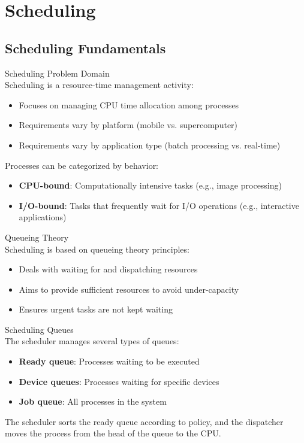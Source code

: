 \section{Scheduling}

\subsection{Scheduling Fundamentals}

\begin{definition}{Scheduling Problem Domain}\\
    Scheduling is a resource-time management activity:
    \begin{itemize}
        \item Focuses on managing CPU time allocation among processes
        \item Requirements vary by platform (mobile vs. supercomputer)
        \item Requirements vary by application type (batch processing vs. real-time)
    \end{itemize}
    
    Processes can be categorized by behavior:
    \begin{itemize}
        \item \textbf{CPU-bound}: Computationally intensive tasks (e.g., image processing)
        \item \textbf{I/O-bound}: Tasks that frequently wait for I/O operations (e.g., interactive applications)
    \end{itemize}
\end{definition}

\begin{definition}{Queueing Theory}\\
    Scheduling is based on queueing theory principles:
    \begin{itemize}
        \item Deals with waiting for and dispatching resources
        \item Aims to provide sufficient resources to avoid under-capacity
        \item Ensures urgent tasks are not kept waiting
    \end{itemize}
\end{definition}

\begin{definition}{Scheduling Queues}\\
    The scheduler manages several types of queues:
    \begin{itemize}
        \item \textbf{Ready queue}: Processes waiting to be executed
        \item \textbf{Device queues}: Processes waiting for specific devices
        \item \textbf{Job queue}: All processes in the system
    \end{itemize}
    
    The scheduler sorts the ready queue according to policy, and the dispatcher moves the process from the head of the queue to the CPU.
\end{definition}

